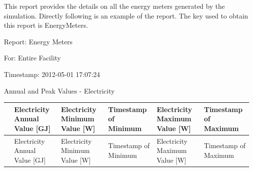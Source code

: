 This report provides the details on all the energy meters generated by the simulation. Directly following is an example of the report. The key used to obtain this report is EnergyMeters.

Report: Energy Meters

For: Entire Facility

Timestamp: 2012-05-01 17:07:24

Annual and Peak Values - Electricity

{\scriptsize
\begin{longtable}[c]{>{\raggedright}p{1.5in}>{\raggedright}p{0.9in}>{\raggedright}p{0.9in}>{\raggedright}p{0.9in}>{\raggedright}p{0.9in}>{\raggedright}p{0.9in}}
\toprule
 & Electricity Annual Value [GJ] & Electricity Minimum Value [W] & Timestamp of Minimum & Electricity Maximum Value [W] & Timestamp of Maximum \tabularnewline
\midrule
\endfirsthead

\toprule
 & Electricity Annual Value [GJ] & Electricity Minimum Value [W] & Timestamp of Minimum & Electricity Maximum Value [W] & Timestamp of Maximum \tabularnewline
\midrule
\endhead


\end{longtable}}
